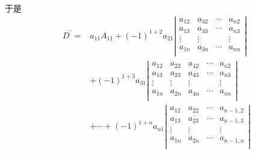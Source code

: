 \begin{frame}
于是
$$
\begin{aligned}
D^\prime =&
a_{11} A_{11}+(-1)^{1+2}a_{21}
\left|
\begin{array}{cccc}
a_{12} & a_{32} & \cdots & a_{n2} \\
a_{13} & a_{33} & \cdots & a_{n3} \\
\vdots & \vdots & & \vdots \\
a_{1n} & a_{3n} & \cdots & a_{nn} \\
\end{array}
\right|  \\
&+ (-1)^{1+3}a_{31}
\left|
\begin{array}{ccccc}
a_{12} & a_{22} & a_{42} & \cdots & a_{n2} \\
a_{13} & a_{23} & a_{43} & \cdots & a_{n3} \\
\vdots & \vdots & \vdots & & \vdots \\
a_{1n} & a_{2n} & a_{4n} & \cdots & a_{nn} \\
\end{array}
\right|  \\
& + \cdots + (-1)^{1+n} a_{n1} \left|
\begin{array}{cccc}
a_{12} & a_{22} & \cdots & a_{n-1,2} \\
a_{13} & a_{23} & \cdots & a_{n-1,3} \\
\vdots & \vdots & & \vdots \\
a_{1n} & a_{2n} & \cdots & a_{n-1,n} \\
\end{array}
\right|
\end{aligned}
$$
\end{frame}

